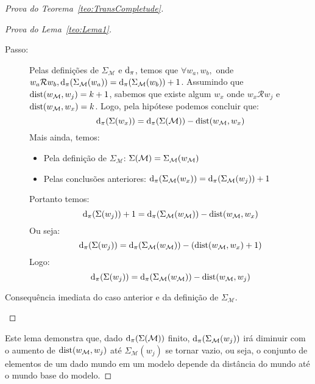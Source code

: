 \begin{apendicesenv}
\begin{proof}[Prova do Teorema~\ref{teo:TransCompletude}]
\begin{proof}[Prova do Lema~\ref{teo:Lema1}]
\begin{description}
\begin{description}
                            \item[Passo:] Pelas definições de \(\Sigma_{\mathcal{M}}\) e \(\operatorname{d}_{\pi}\), temos que \(\forall w_a, w_b,\) onde \(w_a \mathcal{R} w_b,
                                \operatorname{d}_{\pi}(\Sigma_{\mathcal{M}}(w_a)) = \operatorname{d}_{\pi}(\Sigma_{\mathcal{M}}(w_b)) + 1\).
                                Assumindo que \(\operatorname{dist}(w_{\mathcal{M}}, w_j) = k+1\), sabemos que existe algum \(w_x\) onde \(w_x \mathcal{R} w_j\) e \(\operatorname{dist}(w_{\mathcal{M}}, w_x) = k\).
                                Logo, pela hipótese podemos concluir que:
                                \[
                                    \operatorname{d}_{\pi}(\Sigma(w_x)) = \operatorname{d}_{\pi}(\Sigma(\mathcal{M})) - \operatorname{dist}(w_{\mathcal{M}}, w_x)
                                \]
                                Mais ainda, temos:
                                \begin{itemize}
                                    \item Pela definição de \(\Sigma_{\mathcal{M}}\): \(\Sigma(\mathcal{M}) = \Sigma_{\mathcal{M}}(w_{\mathcal{M}})\)
                                    \item Pelas conclusões anteriores: \(\operatorname{d}_{\pi}(\Sigma_{\mathcal{M}}(w_x)) = \operatorname{d}_{\pi}(\Sigma_{\mathcal{M}}(w_j)) + 1\)
                                \end{itemize}
                                Portanto temos:
                                \[
                                    \operatorname{d}_{\pi}(\Sigma(w_j))+1 = \operatorname{d}_{\pi}(\Sigma_{\mathcal{M}}(w_{\mathcal{M}})) - \operatorname{dist}(w_{\mathcal{M}}, w_x)
                                \]
                                Ou seja:
                                \[
                                    \operatorname{d}_{\pi}(\Sigma(w_j)) = \operatorname{d}_{\pi}(\Sigma_{\mathcal{M}}(w_{\mathcal{M}})) - (\operatorname{dist}(w_{\mathcal{M}}, w_x) + 1)
                                \]
                                Logo:
                                \[
                                    \operatorname{d}_{\pi}(\Sigma(w_j)) = \operatorname{d}_{\pi}(\Sigma_{\mathcal{M}}(w_{\mathcal{M}})) - \operatorname{dist}(w_{\mathcal{M}}, w_j)
                                \]
                        \end{description}

                    \item[Caso~\ref{caso:Lema1-2}] Consequência imediata do caso anterior e da definição de \(\Sigma_{\mathcal{M}}\). \qedhere
                \end{description}
            \end{proof}
            Este lema demonstra que, dado \(\operatorname{d}_{\pi}(\Sigma(\mathcal{M}))\) finito, \(\operatorname{d}_{\pi}(\Sigma_{\mathcal{M}}(w_j))\) irá diminuir com o aumento de \(\operatorname{dist}(w_{\mathcal{M}}, w_j)\) até
            \(\Sigma_{\mathcal{M}}(w_j)\) se tornar vazio, ou seja, o conjunto de elementos de um dado mundo em um modelo depende da distância do mundo até o mundo base do modelo.


\end{proof}
\end{apendicesenv}
